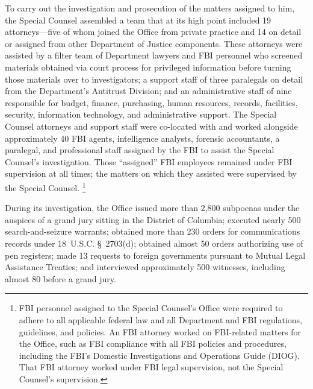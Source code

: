 To carry out the investigation and prosecution of the matters assigned to him, the Special Counsel assembled a team that at its high point included 19 attorneys---five of whom joined the Office from private practice and 14 on detail or assigned from other Department of Justice components.
These attorneys were assisted by a filter team of Department lawyers and FBI personnel who screened materials obtained via court process for privileged information before turning those materials over to investigators; a support staff of three paralegals on detail from the Department's Antitrust Division; and an administrative staff of nine responsible for budget, finance, purchasing, human resources, records, facilities, security, information technology, and administrative support.
The Special Counsel attorneys and support staff were co-located with and worked alongside approximately 40 FBI agents, intelligence analysts, forensic accountants, a paralegal, and professional staff assigned by the FBI to assist the Special Counsel's investigation.
Those ``assigned'' FBI employees remained under FBI supervision at all times; the matters on which they assisted were supervised by the Special Counsel.%
\footnote{FBI personnel assigned to the Special Counsel's Office were required to adhere to all applicable federal law and all Department and FBI regulations, guidelines, and policies.
An FBI attorney worked on FBI-related matters for the Office, such as FBI compliance with all FBI policies and procedures, including the FBI's Domestic Investigations and Operations Guide (DIOG).
That FBI attorney worked under FBI legal supervision, not the Special Counsel's supervision.}

During its investigation, the Office issued more than 2,800 subpoenas under the auspices of a grand jury sitting in the District of Columbia; executed nearly 500 search-and-seizure warrants; obtained more than 230 orders for communications records under 18~U.S.C. \S~2703(d); obtained almost 50 orders authorizing use of pen registers; made 13 requests to foreign governments pursuant to Mutual Legal Assistance Treaties; and interviewed approximately 500 witnesses, including almost 80 before a grand jury.

\hr

